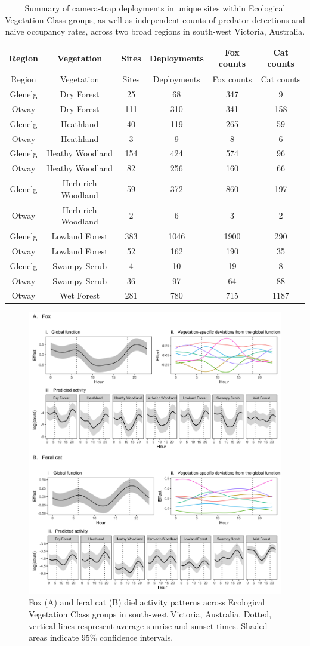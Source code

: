 \documentclass[]{elsarticle} %
\begin{document}
\begin{longtable}[]{@{}cccccc@{}}
\caption{Summary of camera-trap deployments in unique sites within Ecological Vegetation Class groups, as well as independent counts of predator detections and naive occupancy rates, across two broad regions in south-west Victoria, Australia.}\tabularnewline
\toprule
Region & Vegetation & Sites & Deployments & Fox counts & Cat counts\tabularnewline
\midrule
\endfirsthead
\toprule
Region & Vegetation & Sites & Deployments & Fox counts & Cat counts\tabularnewline
\midrule
\endhead
Glenelg & Dry Forest & 25 & 68 & 347 & 9\tabularnewline
Otway & Dry Forest & 111 & 310 & 341 & 158\tabularnewline
Glenelg & Heathland & 40 & 119 & 265 & 59\tabularnewline
Otway & Heathland & 3 & 9 & 8 & 6\tabularnewline
Glenelg & Heathy Woodland & 154 & 424 & 574 & 96\tabularnewline
Otway & Heathy Woodland & 82 & 256 & 160 & 66\tabularnewline
Glenelg & Herb-rich Woodland & 59 & 372 & 860 & 197\tabularnewline
Otway & Herb-rich Woodland & 2 & 6 & 3 & 2\tabularnewline
Glenelg & Lowland Forest & 383 & 1046 & 1900 & 290\tabularnewline
Otway & Lowland Forest & 52 & 162 & 190 & 35\tabularnewline
Glenelg & Swampy Scrub & 4 & 10 & 19 & 8\tabularnewline
Otway & Swampy Scrub & 36 & 97 & 64 & 88\tabularnewline
Otway & Wet Forest & 281 & 780 & 715 & 1187\tabularnewline
\bottomrule
\end{longtable}

\newpage

\begin{figure}
\includegraphics[width=1\linewidth]{../figs/predator_veg} \caption{Fox (A) and feral cat (B) diel activity patterns across Ecological Vegetation Class groups in south-west Victoria, Australia. Dotted, vertical lines respresent average sunrise and sunset times. Shaded areas indicate 95\% confidence intervals.}\label{fig:veg}
\end{figure}
\end{document}
